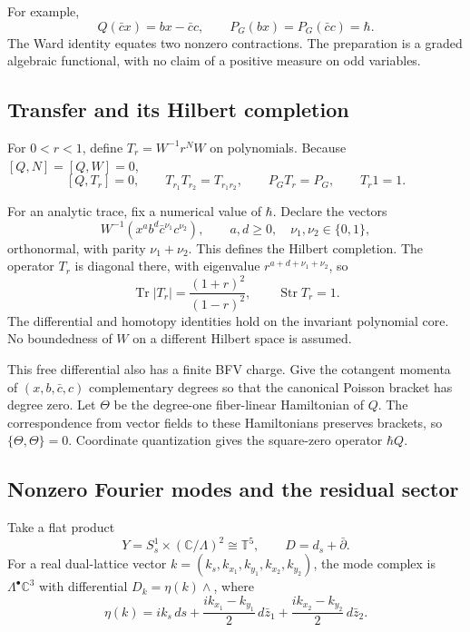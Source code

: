 For example,
\[
 Q(\bar c x)=bx-\bar c c,\qquad
 P_G(bx)=P_G(\bar c c)=\hbar.
\]
The Ward identity equates two nonzero contractions.
The preparation is a graded algebraic functional, with no
claim of a positive measure on odd variables.

\subsection{Transfer and its Hilbert completion}

For $0<r<1$, define $T_r=W^{-1}r^NW$ on polynomials.
Because $[Q,N]=[Q,W]=0$,
\begin{equation}\label{mht:eq:quartet-transfer}
 [Q,T_r]=0,\qquad T_{r_1}T_{r_2}=T_{r_1r_2},
 \qquad P_GT_r=P_G,\qquad T_r1=1.
\end{equation}

For an analytic trace, fix a numerical value of $\hbar$.
Declare the vectors
\[
 W^{-1}(x^ab^d\bar c^{\nu_1}c^{\nu_2}),
 \qquad a,d\geq0,\quad \nu_1,\nu_2\in\{0,1\},
\]
orthonormal, with parity $\nu_1+\nu_2$.
This defines the Hilbert completion. The operator $T_r$ is
diagonal there, with eigenvalue $r^{a+d+\nu_1+\nu_2}$, so
\begin{equation}\label{mht:eq:quartet-supertrace}
 \operatorname{Tr}|T_r|=\frac{(1+r)^2}{(1-r)^2},
 \qquad \operatorname{Str}T_r=1.
\end{equation}
The differential and homotopy identities hold on the invariant
polynomial core. No boundedness of $W$ on a different Hilbert
space is assumed.

This free differential also has a finite BFV charge.
Give the cotangent momenta of $(x,b,\bar c,c)$ complementary
degrees so that the canonical Poisson bracket has degree zero.
Let $\Theta$ be the degree-one fiber-linear Hamiltonian of $Q$.
The correspondence from vector fields to these Hamiltonians
preserves brackets, so $\{\Theta,\Theta\}=0$.
Coordinate quantization gives the square-zero operator $\hbar Q$.

\subsection{Nonzero Fourier modes and the residual sector}

Take a flat product
\[
 Y=S^1_s\times(\mathbb C/\Lambda)^2\cong\mathbb T^5,
 \qquad D=d_s+\bar\partial.
\]
For a real dual-lattice vector
$k=(k_s,k_{x_1},k_{y_1},k_{x_2},k_{y_2})$, the mode complex is
$\Lambda^\bullet\mathbb C^3$ with differential
$D_k=\eta(k)\wedge$, where
\[
 \eta(k)=ik_s\,ds
       +\frac{ik_{x_1}-k_{y_1}}2\,d\bar z_1
       +\frac{ik_{x_2}-k_{y_2}}2\,d\bar z_2.
\]


